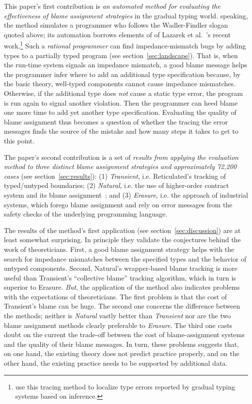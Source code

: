This paper's first contribution is {\em an automated method for evaluating the
effectiveness of blame assignment strategies\/} in the gradual typing world.
speaking, the method simulates a programmer who follows the Wadler-Findler
slogan quoted above; its automation borrows elements of of Lazarek et
al.~\cite{lksfd-popl-2020}'s recent work.\footnote{\citet{cc-snapl-19} use this
tracing method to localize type errors reported by gradual typing systems based
on inference.}  Such a \emph{rational programmer} can find impedance-mismatch
bugs by adding types to a partially typed program (see
section~\ref{sec:landscape}). That is, when the run-time system signals an
impedance mismatch, a good blame message helps the programmer infer where to add
an additional type specification because, by the basic theory, well-typed
components cannot cause impedance mismatches. Otherwise, if the additional type
does {\em not\/} cause a static type error, the program is run again to signal
another violation. Then the programmer can heed blame one more time to add yet
another type specification. Evaluating the quality of blame assignment thus
becomes a question of whether the tracing the error messages finds the source of
the mistake and how many steps it takes to get to this point.

The paper's second contribution is a set of {\em results from applying the
evaluation method to three distinct blame assignment strategies and
approximately 72,200 cases\/} (see section~\ref{sec:results}): (1) {\it
Transient\/}, i.e. Reticulated's tracking of typed/untyped boundaries; (2) {\it
Natural\/}, i.e. the use of higher-order contract system and its blame
assignment~\cite{ff-icfp-2002}; and (3) {\it Erasure\/}, i.e. the approach of
industrial systems, which forego blame assignment and rely on error messages
from the safety checks of the underlying programming language.

The results of the method's first application (see section~\ref{sec:discussion})
are at least somewhat surprising. In principle they validate the conjectures
behind the work of theoreticians. First, a good blame assignment strategy helps
with the search for impedance mismatches between the specified types and the
behavior of untyped components.  Second, Natural's wrapper-based blame tracking
is more useful than Transient's ``collective blame'' tracking algorithm, which
in turn is superior to Erasure. {\em But\/}, the application of the method also
indicates problems with the expectations of theoreticians. The first problem is
that the cost of Transient's blame can be huge. The second one concerns the
difference between the methods; neither is {\it Natural\/} vastly better than
{\it Transient\/} nor are the two blame assignment methods clearly preferable to
{\it Erasure\/}. The third one casts doubt on the current the trade-off between
the cost of blame-assignment systems and the quality of their blame messages.
In turn, these problems suggests that, on one hand, the existing theory does not
predict practice properly, and on the other hand, the existing practice needs to
be supported by additional data. 




